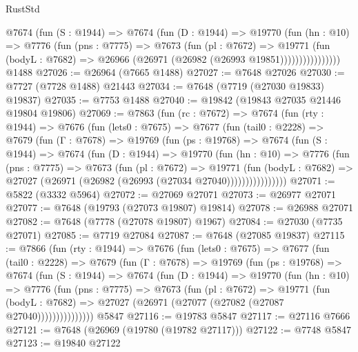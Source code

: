 \begin{lexlean}{RustStd}
\begin{coremodule}
{\begin{coremodule}
{{{{{{{{{{{{{{{{{{{{{{{{{{{{{{{{{{{{{{{{{{{{{{{{{{{{{                @7674
                  (fun (S : @1944) =>
                  @7674
                    (fun (D : @1944) =>
                    @19770
                      (fun (hn : @10) =>
                      @7776
                        (fun (pns : @7775) =>
                        @7673
                          (fun (pl : @7672) =>
                          @19771
                            (fun (bodyL : @7682) =>
                            @26966 (@26971 (@26982 (@26993 @19851))))))))))))))))
    @1488
@27026 := @26964 (@7665 @1488)
@27027 := @7648 @27026
@27030 := @7727 (@7728 @1488) @21443
@27034 := @7648 (@7719 (@27030 @19833) @19837)
@27035 := @7753 @1488
@27040 := @19842 (@19843 @27035 @21446 @19804 @19806)
@27069 := @7863
    (fun (rc : @7672) =>
    @7674
      (fun (rty : @1944) =>
      @7676
        (fun (lets0 : @7675) =>
        @7677
          (fun (tail0 : @2228) =>
          @7679
            (fun (Γ : @7678) =>
            @19769
              (fun (ps : @19768) =>
              @7674
                (fun (S : @1944) =>
                @7674
                  (fun (D : @1944) =>
                  @19770
                    (fun (hn : @10) =>
                    @7776
                      (fun (pns : @7775) =>
                      @7673
                        (fun (pl : @7672) =>
                        @19771
                          (fun (bodyL : @7682) =>
                          @27027 (@26971 (@26982 (@26993 (@27034 @27040))))))))))))))))
@27071 := @5822 (@3332 @5964)
@27072 := @27069 @27071
@27073 := @26977 @27071
@27077 := @7648 (@19793 (@27073 @19807) @19814)
@27078 := @26988 @27071
@27082 := @7648 (@7778 (@27078 @19807) @1967)
@27084 := @27030 (@7735 @27071)
@27085 := @7719 @27084
@27087 := @7648 (@27085 @19837)
@27115 := @7866
    (fun (rty : @1944) =>
    @7676
      (fun (lets0 : @7675) =>
      @7677
        (fun (tail0 : @2228) =>
        @7679
          (fun (Γ : @7678) =>
          @19769
            (fun (ps : @19768) =>
            @7674
              (fun (S : @1944) =>
              @7674
                (fun (D : @1944) =>
                @19770
                  (fun (hn : @10) =>
                  @7776
                    (fun (pns : @7775) =>
                    @7673
                      (fun (pl : @7672) =>
                      @19771
                        (fun (bodyL : @7682) =>
                        @27027 (@26971 (@27077 (@27082 (@27087 @27040)))))))))))))))
    @5847
@27116 := @19783 @5847
@27117 := @27116 @7666
@27121 := @7648 (@26969 (@19780 (@19782 @27117)))
@27122 := @7748 @5847
@27123 := @19840 @27122
}}}}}}}}}}}}}}}}}}}}}}}}}}}}}}}}}}}}}}}}}}}}}}}}}}}}}
\end{coremodule}}
\end{coremodule}
\end{lexlean}

